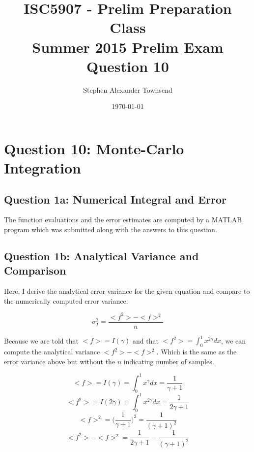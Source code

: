 \documentclass[11pt,a4paper,oneside]{article}
\begin{document}
\title{ISC5907 - Prelim Preparation Class \\ 
	 Summer 2015 Prelim Exam Question 10}
\author{Stephen Alexander Townsend}
\date{\today}
\maketitle

\section{Question 10: Monte-Carlo Integration}
\subsection{Question 1a: Numerical Integral and Error}
   The function evaluations and the error estimates are computed by a MATLAB program which was
submitted along with the answers to this question.  

\subsection{Question 1b: Analytical Variance and Comparison}
   Here, I derive the analytical error variance for the given equation and compare to the 
numerically computed error variance.

\begin{equation}
	\sigma^2_I = \frac{<f^2> - <f>^2}{n}
\end{equation}

Because we are told that $<f> = I(\gamma)$ and that $<f^2> = \int_0^1 x^{2\gamma} dx$, we
can compute the analytical variance $<f^2> - <f>^2$.  Which is the same as the error variance
above but without the $n$ indicating number of samples.

\begin{equation}
	<f> = I(\gamma) = \int_0^1 x^{\gamma} dx = \frac{1}{\gamma + 1}
\end{equation}
\begin{equation}
	<f^2> = I(2\gamma) = \int_0^1 x^{2\gamma} dx = \frac{1}{2\gamma + 1}
\end{equation}
\begin{equation}
	<f>^2 = \big(\frac{1}{\gamma + 1})^2 = \frac{1}{(\gamma + 1)^2}
\end{equation}
\begin{equation}
	<f^2> - <f>^2 = \frac{1}{2\gamma + 1} - \frac{1}{(\gamma + 1)^2}
\end{equation}
\end{document}
